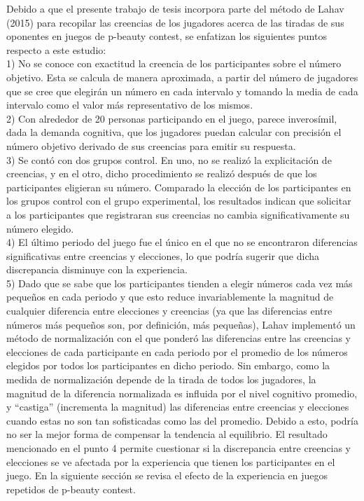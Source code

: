 Debido a que el presente trabajo de tesis incorpora parte del método de Lahav (2015) para recopilar las creencias de los jugadores acerca de las tiradas de sus oponentes en juegos de p-beauty contest, se enfatizan los siguientes puntos respecto a este estudio: \\

1) No se conoce con exactitud la creencia de los participantes sobre el número objetivo. Esta se calcula de manera aproximada, a partir del número de jugadores que se cree que elegirán un número en cada intervalo y tomando la media de cada intervalo como el valor más representativo de los mismos.\\

2) Con alrededor de 20 personas participando en el juego, parece inverosímil, dada la demanda cognitiva, que los jugadores puedan calcular con precisión el número objetivo derivado de sus creencias para emitir su respuesta.\\

3) Se contó con dos grupos control. En uno,  no se realizó la explicitación de creencias, y en el otro, dicho procedimiento se realizó después de que los participantes eligieran su número. Comparado la elección de los participantes en los grupos control con el grupo experimental, los resultados indican que solicitar a los participantes que registraran sus creencias no cambia significativamente  su número elegido.\\

4) El último periodo del juego fue el único en el que no se encontraron diferencias significativas entre creencias y elecciones, lo que podría sugerir que dicha discrepancia disminuye con la experiencia.\\

5) Dado que se sabe que los participantes tienden a elegir números cada vez más pequeños en cada periodo y que esto reduce invariablemente la magnitud de cualquier diferencia entre elecciones y creencias (ya que las diferencias entre números más pequeños son, por definición, más pequeñas), Lahav implementó un método de normalización con el que ponderó las diferencias entre las creencias y elecciones de cada participante en cada periodo por el promedio de los números elegidos por todos los participantes en dicho periodo. Sin embargo, como la medida de normalización depende de la tirada de todos los jugadores, la magnitud de la diferencia normalizada es influida por el nivel cognitivo promedio, y “castiga” (incrementa la magnitud) las diferencias entre creencias y elecciones cuando estas no son tan sofisticadas como las del promedio. Debido a esto, podría no ser la mejor forma de compensar la tendencia al equilibrio.
El resultado mencionado en el punto 4 permite cuestionar si la discrepancia entre creencias y elecciones se ve afectada por la experiencia que tienen los participantes en el juego.  En la siguiente sección se revisa el efecto de la experiencia en juegos repetidos de p-beauty contest.\\

